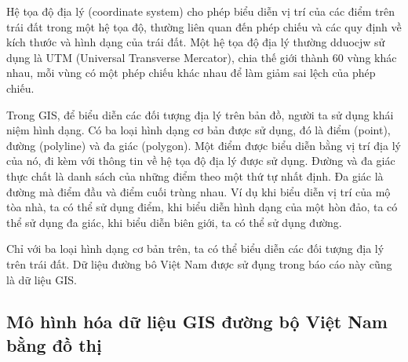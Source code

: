 \documentclass[14pt, oneside, a4paper, openany]{scrartcl}
\begin{document}
Hệ tọa độ địa lý (coordinate system) cho phép biểu diễn vị trí của các điểm trên trái đất trong một hệ tọa độ, thường liên quan đến phép chiếu và các quy định về kích thước và hình dạng của trái đất. Một hệ tọa độ địa lý thường dduocjw sử dụng là UTM (Universal Transverse Mercator), chia thế giới thành 60 vùng khác nhau, mỗi vùng có một phép chiếu khác nhau để làm giảm sai lệch của phép chiếu.

Trong GIS, để biểu diễn các đối tượng địa lý trên bản đồ, người ta sử dụng khái niệm hình dạng. Có ba loại hình dạng cơ bản được sử dụng, đó là điểm (point), đường (polyline) và đa giác (polygon).
Một điểm được biểu diễn bằng vị trí địa lý của nó, đi kèm với thông tin về hệ tọa độ địa lý được sử dụng.
Đường và đa giác thực chất là danh sách của những điểm theo một thứ tự nhất định.
Đa giác là đường mà điểm đầu và điểm cuối trùng nhau.
Ví dụ khi biểu diễn vị trí của mộ tòa nhà, ta có thể sử dụng điểm, khi biểu diễn hình dạng của một hòn đảo, ta có thể sử dụng đa giác, khi biểu diễn biên giới, ta có thể sử dụng đường.

Chỉ với ba loại hình dạng cơ bản trên, ta có thể biểu diễn các đối tượng địa lý trên trái đất. Dữ liệu đường bô Việt Nam được sử đụng trong báo cáo này cũng là dữ liệu GIS.
\subsection{Mô hình hóa dữ liệu GIS đường bộ Việt Nam bằng đồ thị}
\end{document}
